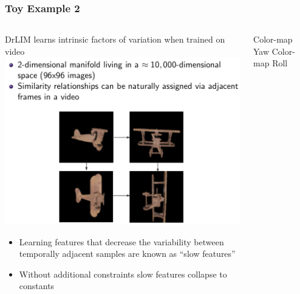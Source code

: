 \documentclass{beamer}
\begin{document}
\begin{frame} 
\frametitle{Toy Example 2}
\begin{columns}[T] %
\begin{column}{.5\textwidth}
DrLIM learns intrinsic factors of variation when trained on video \\ \vspace{0.25cm} 
\includegraphics[scale=0.20]{./Figures/drlim_data.png} 
\begin{itemize} \tiny \item{Learning features that decrease the variability between temporally adjacent samples are known as ``slow features''} 
\tiny \item{Without additional constraints slow features collapse to constants}
\end{itemize} 
\end{column} 
\begin{column}{.5\textwidth}
\hspace{0.25cm} \tiny{Color-map Yaw} \hspace{0.8cm} \tiny{Color-map Roll} \\

\end{column}
\end{columns}
\end{frame}
\end{document}
